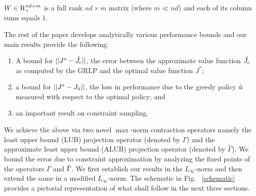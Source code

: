 \begin{assumption}\label{wassump}
$W \in \mathrm{R}^{nd\times m}_+$ is a full rank $nd\times m$  matrix (where $m\ll nd$) and each of its column sums equals $1$.
\end{assumption}
\begin{comment}
The above assumption is just a technical condition that eliminates uninteresting choices such as $W=0$ or cases when certain columns of $W$ have all zeros, which implies that the corresponding column generates no constraint.
\end{comment}

The rest of the paper develops analytically various performance bounds and our main results provide the following:
\begin{enumerate}
\item A bound for $||J^*-\hat{J}_c||$, the error between the approximate value function $\hat{J}_c$ as computed by the GRLP and the optimal value function $J^*$;
\item a bound for $||J^*-J_{\hat{u}}||$, the loss in performance due to the greedy policy $\hat{u}$ measured with respect to the optimal policy; and
\item an important result on constraint sampling.
\end{enumerate}
We achieve the above via two novel $\max$-norm contraction operators namely the least upper bound (LUB) projection operator (denoted by $\Gamma$) and the approximate least upper bound (ALUB) projection operator (denoted by $\hat{\Gamma}$). We bound the error due to constraint approximation by analyzing the fixed points of the operators $\Gamma$ and $\hat{\Gamma}$. We first establish our results in the $L_\infty$-norm and then extend the same in a modified $L_\infty$-norm. The schematic in Fig. ~\ref{schematic} provides a pictorial representation of what shall follow in the next three sections.
\FloatBarrier


